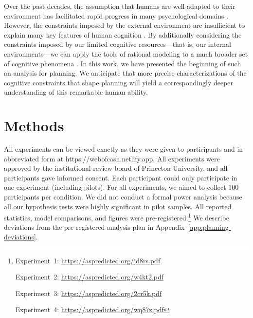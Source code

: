 
Over the past decades, the assumption that humans are well-adapted to their environment \citep{marr1982vision,anderson1990adaptive} has facilitated rapid progress in many psychological domains \citep{oaksford1994rational,gureckis2012selfdirected,tenenbaum2001generalization,anderson1991adaptive,ashby1995categorization,savage1954foundations}. However, the constraints imposed by the external environment are insufficient to explain many key features of human cognition \citep{rahnev2018suboptimality,lieder2020resourcerational}. By additionally considering the constraints imposed by our limited cognitive resources---that is, our internal environments---we can apply the tools of rational modeling to a much broader set of cognitive phenomena \citep{griffiths2015rational,lieder2020resourcerational}. In this work, we have presented the beginning of such an analysis for planning. We anticipate that more precise characterizations of the cognitive constraints that shape planning will yield a correspondingly deeper understanding of this remarkable human ability.


\section{Methods}\label{sec:planning-methods}

All experiments can be viewed exactly as they were given to participants and in abbreviated form at https://webofcash.netlify.app. All experiments were approved by the institutional review board of Princeton University, and all participants gave informed consent. Each participant could only participate in one experiment (including pilots). For all experiments, we aimed to collect $100$ participants per condition. We did not conduct a formal power analysis because all our hypothesis tests were highly significant in pilot samples. All reported statistics, model comparisons, and figures were pre-registered.\footnote{%
  Experiment~1: \url{https://aspredicted.org/jd8rs.pdf}\par
  Experiment~2: \url{https://aspredicted.org/w4kt2.pdf}\par
  Experiment~3: \url{https://aspredicted.org/2cr5k.pdf}\par
  Experiment~4: \url{https://aspredicted.org/wq87z.pdf}\par
} We describe deviations from the pre-registered analysis plan in Appendix~\ref{app:planning-deviations}.



